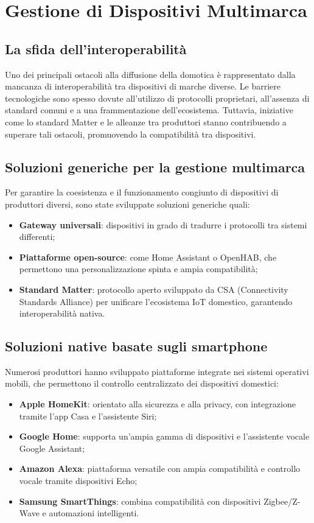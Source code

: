 \chapter{Gestione di Dispositivi Multimarca}
\section{La sfida dell'interoperabilità}
Uno dei principali ostacoli alla diffusione della domotica è rappresentato dalla mancanza di interoperabilità tra dispositivi di marche diverse. Le barriere tecnologiche sono spesso dovute all'utilizzo di protocolli proprietari, all'assenza di standard comuni e a una frammentazione dell'ecosistema. Tuttavia, iniziative come lo standard Matter e le alleanze tra produttori stanno contribuendo a superare tali ostacoli, promuovendo la compatibilità tra dispositivi.

\section{Soluzioni generiche per la gestione multimarca}
Per garantire la coesistenza e il funzionamento congiunto di dispositivi di produttori diversi, sono state sviluppate soluzioni generiche quali:
\begin{itemize}
    \item \textbf{Gateway universali}: dispositivi in grado di tradurre i protocolli tra sistemi differenti;
    \item \textbf{Piattaforme open-source}: come Home Assistant o OpenHAB, che permettono una personalizzazione spinta e ampia compatibilità;
    \item \textbf{Standard Matter}: protocollo aperto sviluppato da CSA (Connectivity Standards Alliance) per unificare l'ecosistema IoT domestico, garantendo interoperabilità nativa.
\end{itemize}

\section{Soluzioni native basate sugli smartphone}
Numerosi produttori hanno sviluppato piattaforme integrate nei sistemi operativi mobili, che permettono il controllo centralizzato dei dispositivi domestici:
\begin{itemize}
    \item \textbf{Apple HomeKit}: orientato alla sicurezza e alla privacy, con integrazione tramite l'app Casa e l'assistente Siri;
    \item \textbf{Google Home}: supporta un'ampia gamma di dispositivi e l'assistente vocale Google Assistant;
    \item \textbf{Amazon Alexa}: piattaforma versatile con ampia compatibilità e controllo vocale tramite dispositivi Echo;
    \item \textbf{Samsung SmartThings}: combina compatibilità con dispositivi Zigbee/Z-Wave e automazioni intelligenti.
\end{itemize}

